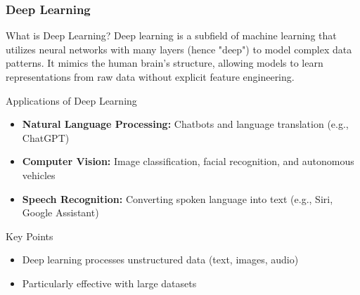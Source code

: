 \documentclass[aspectratio=169]{beamer}
\begin{document}
\begin{frame}[fragile]
    \frametitle{Deep Learning}
    \begin{block}{What is Deep Learning?}
        Deep learning is a subfield of machine learning that utilizes neural networks with many layers (hence "deep") to model complex data patterns. It mimics the human brain's structure, allowing models to learn representations from raw data without explicit feature engineering.
    \end{block}

    \begin{block}{Applications of Deep Learning}
        \begin{itemize}
            \item \textbf{Natural Language Processing:} Chatbots and language translation (e.g., ChatGPT)
            \item \textbf{Computer Vision:} Image classification, facial recognition, and autonomous vehicles
            \item \textbf{Speech Recognition:} Converting spoken language into text (e.g., Siri, Google Assistant)
        \end{itemize}
    \end{block}
    
    \begin{block}{Key Points}
        \begin{itemize}
            \item Deep learning processes unstructured data (text, images, audio)
            \item Particularly effective with large datasets
        \end{itemize}
    \end{block}
\end{frame}
\end{document}
